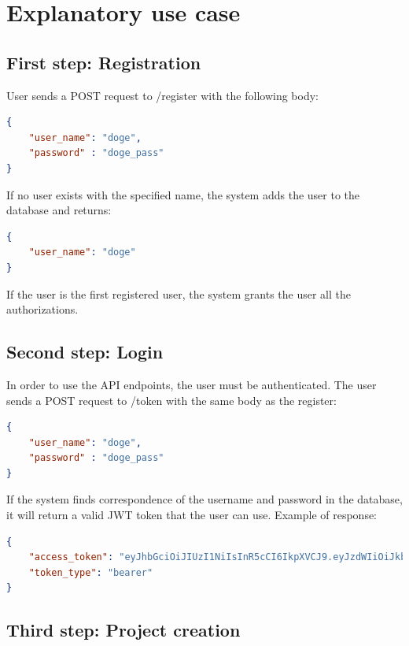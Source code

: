\documentclass[12pt]{report}
\begin{document}
\chapter{Explanatory use case}

\section{First step: Registration}
User sends a POST request to /register with the following body:

\begin{lstlisting}[language=json, caption=register form]
{
	"user_name": "doge",
	"password" : "doge_pass"
}
\end{lstlisting}
If no user exists with the specified name, the system adds the user to the database and returns:

\begin{lstlisting}[language=json, caption=register response]
{
    "user_name": "doge"
}
\end{lstlisting}
If the user is the first registered user, the system grants the user all the authorizations.

\section{Second step: Login}
In order to use the API endpoints, the user must be authenticated.
The user sends a POST request to /token with the same body as the register:

\begin{lstlisting}[language=json, caption=Login form]
{
	"user_name": "doge",
	"password" : "doge_pass"
}
\end{lstlisting}

If the system finds correspondence of the username and password in the database, it will return a valid JWT token that the user can use.
Example of response:

\begin{lstlisting}[language=json, caption=Token response]
{
    "access_token": "eyJhbGciOiJIUzI1NiIsInR5cCI6IkpXVCJ9.eyJzdWIiOiJkb2dlIiwiZXhwIjoxNjU0MTg0MTM2fQ.SToW2wOkh2KrVRdQDfTaSZeG5Qajy9DzoXwB4HQNf0k",
    "token_type": "bearer"
}
\end{lstlisting}

\section{Third step: Project creation}
\end{document}
